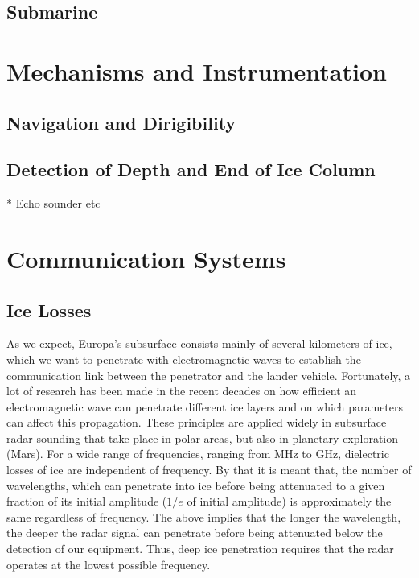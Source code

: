 \subsection{Submarine}

\section{Mechanisms and Instrumentation}

\subsection{Navigation and Dirigibility}

\subsection{Detection of Depth and End of Ice Column}

* Echo sounder etc

\section{Communication Systems}

\subsection{Ice Losses}
As we expect, Europa's subsurface consists mainly of several kilometers of ice, which we want to penetrate with electromagnetic waves to establish the communication link between the penetrator and the lander vehicle. Fortunately, a lot of research has been made in the recent decades on how efficient an electromagnetic wave can penetrate different ice layers and on which parameters can affect this propagation. These principles are applied widely in subsurface radar sounding that take place in polar areas, but also in planetary exploration (Mars). For a wide range of frequencies, ranging from MHz to GHz, dielectric losses of ice are independent of frequency. By that it is meant that, the number of wavelengths, which can penetrate into ice before being attenuated to a given fraction of its initial amplitude ($1/e$ of initial amplitude) is approximately the same regardless of frequency. The above implies that the longer the wavelength, the deeper the radar signal can penetrate before being attenuated below the detection of our equipment. Thus, deep ice penetration requires that the radar operates at the lowest possible frequency. 

